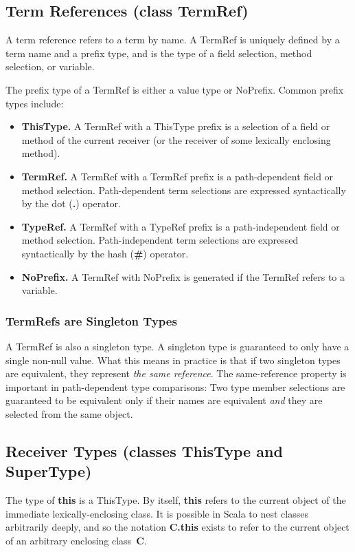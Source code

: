 \documentclass[11pt]{report}
\newcommand{\cdf}{\bf\ttfamily} %
\newcommand{\cd}{\cdf\small}  %
\begin{document}
\subsection{Term References (class TermRef)}

A term reference refers to a term by name.
A TermRef is uniquely defined by a term name and a prefix type, and is the type of a field selection, method selection, or variable.

The prefix type of a TermRef is either a value type or NoPrefix. Common prefix types include:
\begin{itemize}
\item {\bf ThisType.} A TermRef with a ThisType prefix is a selection of a field or method of the current receiver (or the receiver of some lexically enclosing method).
\item {\bf TermRef.} A TermRef with a TermRef prefix is a path-dependent field or method selection. Path-dependent term selections are expressed syntactically by the dot ({\cd .}) operator.
\item {\bf TypeRef.} A TermRef with a TypeRef prefix is a path-independent field or method selection. Path-independent term selections are expressed syntactically by the hash ({\cd \#}) operator.
\item {\bf NoPrefix.} A TermRef with NoPrefix is generated if the TermRef refers to a variable.
\end{itemize}

\subsubsection{TermRefs are Singleton Types}

A TermRef is also a singleton type. A singleton type is guaranteed to only have a single non-null value. What this means in practice is that if two singleton types are equivalent, they represent {\em the same reference}. The same-reference property is important in path-dependent type comparisons: Two type member selections are guaranteed to be equivalent only if their names are equivalent {\em and} they are selected from the same object.

\subsection{Receiver Types (classes ThisType and SuperType)}

The type of {\cd this} is a ThisType. By itself, {\cd this} refers to the current object of the immediate lexically-enclosing class. It is possible in Scala to nest classes arbitrarily deeply, and so the notation {\cd C.this} exists to refer to the current object of an arbitrary enclosing class~{\cd C}.
\end{document}
